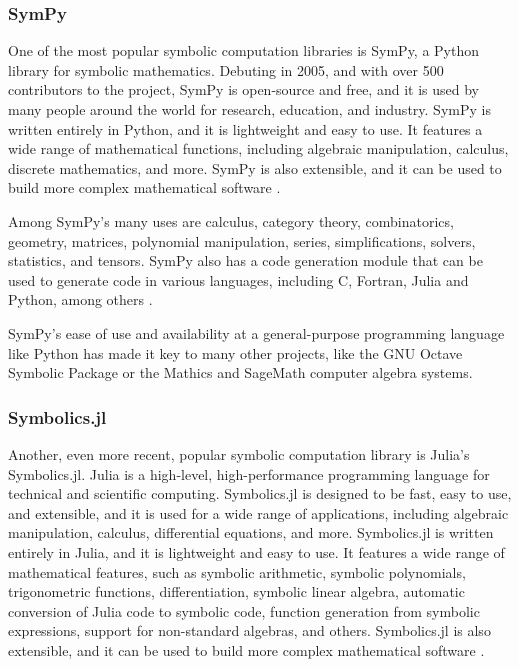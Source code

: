 \subsubsection{SymPy}\label{subsubsec:sympy}

One of the most popular symbolic computation libraries is SymPy, a Python library for symbolic mathematics. Debuting in 2005, and with over 500 contributors to the project, SymPy is open-source and free, and it is used by many people around the world for research, education, and industry. SymPy is written entirely in Python, and it is lightweight and easy to use. It features a wide range of mathematical functions, including algebraic manipulation, calculus, discrete mathematics, and more. SymPy is also extensible, and it can be used to build more complex mathematical software \parencite{meurer2017sympy}.

Among SymPy's many uses are calculus, category theory, combinatorics, geometry, matrices, polynomial manipulation, series, simplifications, solvers, statistics, and tensors. SymPy also has a code generation module that can be used to generate code in various languages, including C, Fortran, Julia and Python, among others \parencite{meurer2017sympy}.

SymPy's ease of use and availability at a general-purpose programming language like Python has made it key to many other projects, like the GNU Octave Symbolic Package or the Mathics and SageMath computer algebra systems.

\subsubsection{Symbolics.jl}\label{subsubsec:symbolics-jl}

Another, even more recent, popular symbolic computation library is Julia's Symbolics.jl. Julia is a high-level, high-performance programming language for technical and scientific computing. Symbolics.jl is designed to be fast, easy to use, and extensible, and it is used for a wide range of applications, including algebraic manipulation, calculus, differential equations, and more. Symbolics.jl is written entirely in Julia, and it is lightweight and easy to use. It features a wide range of mathematical features, such as symbolic arithmetic, symbolic polynomials, trigonometric functions, differentiation, symbolic linear algebra, automatic conversion of Julia code to symbolic code, function generation from symbolic expressions, support for non-standard algebras, and others. Symbolics.jl is also extensible, and it can be used to build more complex mathematical software \parencite{gowda2021high}. 

